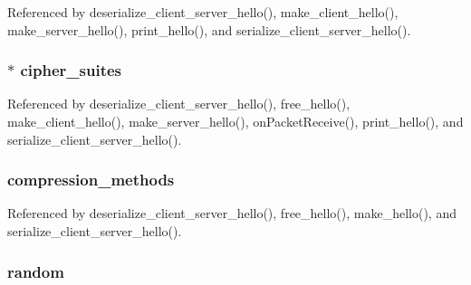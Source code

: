 Referenced by deserialize\+\_\+client\+\_\+server\+\_\+hello(), make\+\_\+client\+\_\+hello(), make\+\_\+server\+\_\+hello(), print\+\_\+hello(), and serialize\+\_\+client\+\_\+server\+\_\+hello().

\subsubsection[{\texorpdfstring{cipher\+\_\+suites}{cipher_suites}}]{$\ast$ cipher\+\_\+suites}\hypertarget{structserver__client__hello__t_a545e2b09874bc2250aed603ef61820a6}{}\label{structserver__client__hello__t_a545e2b09874bc2250aed603ef61820a6}


Referenced by deserialize\+\_\+client\+\_\+server\+\_\+hello(), free\+\_\+hello(), make\+\_\+client\+\_\+hello(), make\+\_\+server\+\_\+hello(), on\+Packet\+Receive(), print\+\_\+hello(), and serialize\+\_\+client\+\_\+server\+\_\+hello().

\subsubsection[{\texorpdfstring{compression\+\_\+methods}{compression_methods}}]{ compression\+\_\+methods}\hypertarget{structserver__client__hello__t_a08a470f144044c5ea244590f9ead8165}{}\label{structserver__client__hello__t_a08a470f144044c5ea244590f9ead8165}


Referenced by deserialize\+\_\+client\+\_\+server\+\_\+hello(), free\+\_\+hello(), make\+\_\+hello(), and serialize\+\_\+client\+\_\+server\+\_\+hello().

\subsubsection[{\texorpdfstring{random}{random}}]{ random}\hypertarget{structserver__client__hello__t_aefaae3d96978baaa21b9445a5728b4fe}{}\label{structserver__client__hello__t_aefaae3d96978baaa21b9445a5728b4fe}


